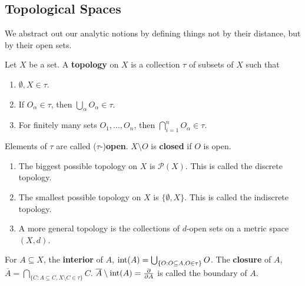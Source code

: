 \subsection{Topological Spaces}
We abstract out our analytic notions by defining things not by their distance, but by their open sets.
\begin{definition}
    Let $X$ be a set. A \textbf{topology} on $X$ is a collection $\tau$ of subsets of $X$ such that
    \begin{enumerate}
        \item $\emptyset, X \in \tau$.
        \item If $O_{\alpha} \in \tau$, then $\bigcup_{\alpha} O_{\alpha} \in \tau$.
        \item For finitely many sets $O_1, \dots, O_n$, then $\bigcap_{i = 1}^n O_{\alpha} \in \tau$.
    \end{enumerate}
    Elements of $\tau$ are called ($\tau$-)\textbf{open}. $X \setminus O$ is \textbf{closed} if $O$ is open.
\end{definition}
\begin{example}
    \begin{enumerate}
        \item The biggest possible topology on $X$ is $\mathcal{P}(X)$. This is called the discrete topology.
        \item The smallest possible topology on $X$ is $\{\emptyset, X\}$. This is called the indiscrete topology.
        \item A more general topology is the collections of $d$-open sets on a metric space $(X, d)$.
    \end{enumerate}
\end{example}
\begin{definition}
    For $A \subseteq X$, the \textbf{interior} of $A$, $\operatorname{int}(A) = \bigcup_{\{O :O \subseteq A, O \in \tau\}} O$.
    The \textbf{closure} of $A$, $\overline{A} = \bigcap_{\{C: A \subseteq C, X \setminus C \in \tau\}} C $.
    $\overline{A} \setminus \operatorname{int}(A) = \pdv{A}$ is called the boundary of $A$.
\end{definition}